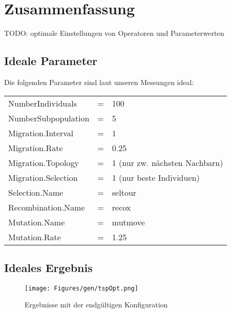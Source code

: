 \section{Zusammenfassung}\label{conclusion}

TODO: optimale Einstellungen von Operatoren und Parameterwerten

\subsection{Ideale Parameter}

Die folgenden Parameter sind laut unseren Messungen ideal: \\

\begin{tabular}{l c l}
  NumberIndividuals   & = & 100       \\
  NumberSubpopulation & = & 5         \\
  Migration.Interval  & = & 1         \\
  Migration.Rate      & = & 0.25      \\
  Migration.Topology  & = & 1 (nur zw. nächsten Nachbarn) \\
  Migration.Selection & = & 1 (nur beste Individuen)      \\
  Selection.Name      & = & seltour   \\
  Recombination.Name  & = & recox     \\
  Mutation.Name       & = & mutmove   \\
  Mutation.Rate       & = & 1.25
\end{tabular}

\subsection{Ideales Ergebnis}



\begin{figure}[h!]
  \centering
  \texttt{[image: Figures/gen/tspOpt.png]}
  \caption{Ergebnisse mit der endgültigen Konfiguration}\label{fig.tspOpt}
\end{figure}

